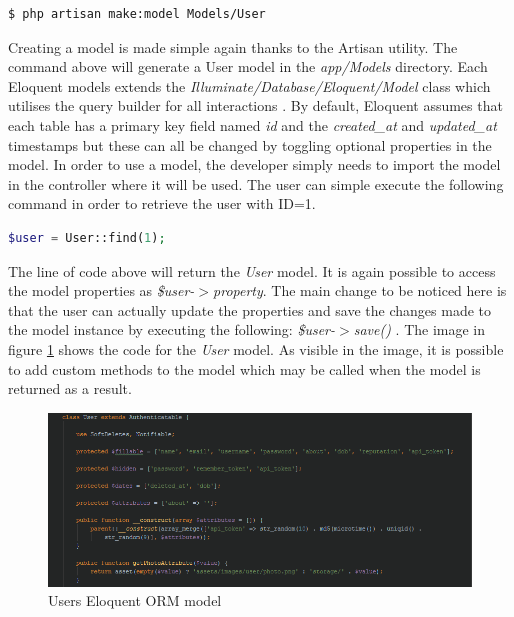 \begin{lstlisting}[language=bash]
	$ php artisan make:model Models/User
\end{lstlisting}

Creating a model is made simple again thanks to the Artisan utility. The command above will generate a User model in the \emph{app/Models} directory. Each Eloquent models extends the \emph{Illuminate/Database/Eloquent/Model} class which utilises the query builder for all interactions \cite{Laravel:Eloquent}. By default, Eloquent assumes that each table has a primary key field named \emph{id} and the \emph{created\_at} and \emph{updated\_at} timestamps but these can all be changed by toggling optional properties in the model. In order to use a model, the developer simply needs to import the model in the controller where it will be used. The user can simple execute the following command in order to retrieve the user with ID=1.

\begin{lstlisting}[language=php]
	$user = User::find(1);
\end{lstlisting}

The line of code above will return the \emph{User} model. It is again possible to access the model properties as \emph{\$user-$>$property}. The main change to be noticed here is that the user can actually update the properties and save the changes made to the model instance by executing the following: \emph{\$user-$>$save()} \cite{Laravel:Eloquent}.  The image in figure \ref{fig:UserModel} shows the code for the \emph{User} model. As visible in the image, it is possible to add custom methods to the model which may be called when the model is returned as a result.

\begin{figure}[H]
	\centering
	\includegraphics[width=1.0\textwidth]{Images/Implementation/UserModel}
	\caption{Users Eloquent ORM model} \label{fig:UserModel}
\end{figure}